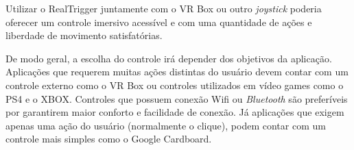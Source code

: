 Utilizar o RealTrigger juntamente com o VR Box ou outro \textit{joystick} poderia oferecer um controle imersivo acessível e com uma quantidade de ações e liberdade de movimento satisfatórias. 

De modo geral, a escolha do controle irá depender dos objetivos da aplicação. Aplicações que requerem muitas ações distintas do usuário devem contar com um controle externo como o VR Box ou controles utilizados em vídeo games como o PS4 e o XBOX. Controles que possuem conexão Wifi ou \textit{Bluetooth} são preferíveis por garantirem maior conforto e facilidade de conexão. Já aplicações que exigem apenas uma ação do usuário (normalmente o clique), podem contar com um controle mais simples como o Google Cardboard. 







